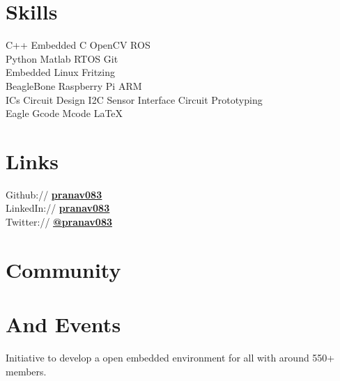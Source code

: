\documentclass[]{font}
\begin{document}
\begin{minipage}[t]{0.30\textwidth}
\section{Skills}
C++ \textbullet{}  Embedded C \textbullet{} OpenCV \textbullet{} ROS \\
Python \textbullet{} Matlab \textbullet{} RTOS   \textbullet{} Git \\
Embedded Linux \textbullet{} Fritzing \\ 
BeagleBone \textbullet{} Raspberry Pi \textbullet{} ARM \\
 ICs \textbullet{} Circuit Design \textbullet{} I2C \textbullet{} Sensor Interface \textbullet{} Circuit Prototyping  \\
Eagle \textbullet{} Gcode \textbullet{} Mcode \textbullet{} \LaTeX\ \\
\sectionsep



\section{Links} 
Github://   \href{https://github.com/pranav083}{\underline{\textbf{ pranav083}}} \\
LinkedIn:// \href{https://www.linkedin.com/in/pranav083}{\underline{\bf pranav083}} \\
Twitter://  \href{https://twitter.com/pranav083}{\underline{\bf @pranav083}} \\




\section{Community }
\section{And Events }
\textbullet{}Initiative to develop a open embedded environment for all with around 550+ members.
\sectionsep


\end{minipage}
\end{document}

